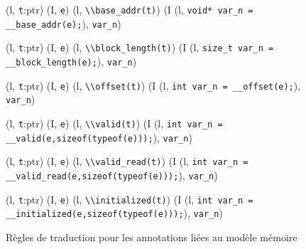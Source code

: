 \begin{figure*}[bt]
  \scriptsize{
    {
      {(l, \mbox{\lstinline't'}:ptr)  (I, \mbox{\lstinline'e'}) }
      {(l, \mbox{\lstinline'\\base_addr(t)'}) 
        (I \concat
        (l, \mbox{\lstinline'void* var_n = __base_addr(e);'}),
        \mbox{\lstinline'var_n'})
      }{}
    }

    {
      {(l, \mbox{\lstinline't'}:ptr)  (I, \mbox{\lstinline'e'}) }
      {(l, \mbox{\lstinline'\\block_length(t)'}) 
        (I \concat
        (l, \mbox{\lstinline'size_t var_n = __block_length(e);'}),
        \mbox{\lstinline'var_n'})
      }{}
    }

    {
      {(l, \mbox{\lstinline't'}:ptr)  (I, \mbox{\lstinline'e'}) }
      {(l, \mbox{\lstinline'\\offset(t)'}) 
        (I \concat
        (l, \mbox{\lstinline'int var_n = __offset(e);'}),
        \mbox{\lstinline'var_n'})
      }{}
    }

    {
      {(l, \mbox{\lstinline't'}:ptr)  (I, \mbox{\lstinline'e'}) }
      {(l, \mbox{\lstinline'\\valid(t)'}) 
        (I \concat
        (l, \mbox{\lstinline'int var_n = __valid(e,sizeof(typeof(e)));'}),
        \mbox{\lstinline'var_n'})
      }{}
    }

    {
      {(l, \mbox{\lstinline't'}:ptr)  (I, \mbox{\lstinline'e'}) }
      {(l, \mbox{\lstinline'\\valid_read(t)'}) 
        (I \concat
        (l, \mbox{\lstinline'int var_n = __valid_read(e,sizeof(typeof(e)));'}),
        \mbox{\lstinline'var_n'})
      }{}
    }

    {
      {(l, \mbox{\lstinline't'}:ptr)  (I, \mbox{\lstinline'e'}) }
      {(l, \mbox{\lstinline'\\initialized(t)'}) 
        (I \concat
        (l, \mbox{\lstinline'int var_n = __initialized(e,sizeof(typeof(e)));'}),
        \mbox{\lstinline'var_n'})
      }{}
    }
  }
  \caption{Règles de traduction pour les annotations liées au modèle mémoire}
  \label{fig:mem-annots-rules}
\end{figure*}


